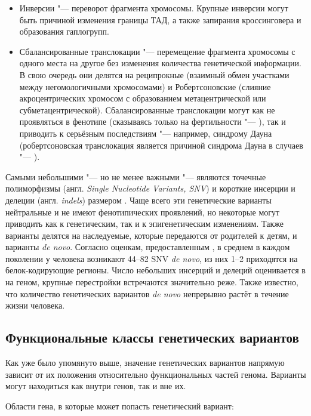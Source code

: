 \documentclass[a4paper,14pt]{extarticle}
\newcommand{\engterm}[1]{англ. \textenglish{\textit{#1}}}
\begin{document}
\begin{itemize}
	\item Инверсии "--- переворот фрагмента хромосомы.
	 Крупные инверсии могут быть причиной изменения границы ТАД, а также запирания кроссинговера и образования гаплогрупп.
	\item Сбалансированные транслокации "--- перемещение фрагмента хромосомы с одного места на другое без изменения количества генетической информации.
	 В свою очередь они делятся на реципрокные (взаимный обмен участками между негомологичными хромосомами) и Робертсоновские (слияние акроцентрических хромосом с образованием метацентрической или субметацентрической).
	 Сбалансированные транслокации могут как не проявляться в фенотипе (сказываясь только на фертильности "--- \citealp{Dong_2012}), так и приводить к серьёзным последствиям "--- например, синдрому Дауна (робертсоновская транслокация является причиной синдрома Дауна в  случаев "--- \citealp{Asim_2015}).
\end{itemize}

Самыми небольшими "--- но не менее важными "--- являются точечные полиморфизмы (\engterm{Single Nucleotide Variants, SNV}) и короткие инсерции и делеции (\engterm{indels}) размером .
Чаще всего эти генетические варианты нейтральные и не имеют фенотипических проявлений, но некоторые могут приводить как к генетическим, так и к эпигенетическим изменениям.
Также варианты делятся на наследуемые, которые передаются от родителей к детям, и варианты \textit{de novo}.
Согласно оценкам, предоставленным \citet{Acuna_Hidalgo_2016}, в среднем в каждом поколении у человека возникают 44--82 SNV \textit{de novo}, из них 1--2 приходятся на белок-кодирующие регионы.
Число небольших инсерций и делеций оценивается в  на геном, крупные перестройки встречаются значительно реже.
Также известно, что количество генетических вариантов \textit{de novo} непрерывно растёт в течение жизни человека.

\subsection{Функциональные классы генетических вариантов}

Как уже было упомянуто выше, значение генетических вариантов напрямую зависит от их положения относительно функциональных частей генома.
Варианты могут находиться как внутри генов, так и вне их.

Области гена, в которые может попасть генетический вариант:
\end{document}
